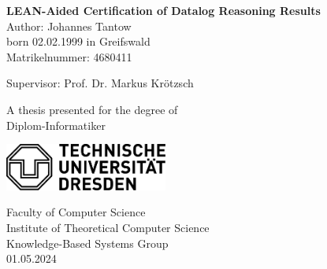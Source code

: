 \begin{titlepage}
    \begin{center}
        \vspace*{1cm}
            
        \Huge
        \textbf{LEAN-Aided Certification of Datalog Reasoning Results}\\
        \vspace{1.5cm}
        \Large
        Author: Johannes Tantow \\
        born 02.02.1999 in Greifswald\\
        Matrikelnummer: 4680411
        
        \vspace{1cm}
        Supervisor: Prof. Dr. Markus Krötzsch
        \vfill
            
        A thesis presented for the degree of\\
        Diplom-Informatiker
            
        \vspace{0.8cm}
        \begin{center}
        \includegraphics[width=0.4\textwidth]{TUD_Logo_schwarz_80.png}
        \end{center}
        \vspace{0.8cm}
        \Large
        Faculty of Computer Science\\
        Institute of Theoretical Computer Science\\
        Knowledge-Based Systems Group\\
        01.05.2024
            
    \end{center}
\end{titlepage}